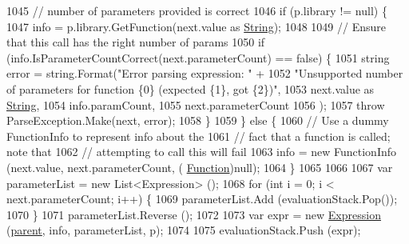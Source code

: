 \begin{DoxyCode}
1045                         \textcolor{comment}{// number of parameters provided is correct}
1046                         \textcolor{keywordflow}{if} (p.library != null) \{
1047                             info = p.library.GetFunction(next.value as \hyperlink{a00031_a301aa7c866593a5b625a8fc158bbeacea27118326006d3829667a400ad23d5d98}{String});
1048 
1049                             \textcolor{comment}{// Ensure that this call has the right number of params}
1050                             \textcolor{keywordflow}{if} (info.IsParameterCountCorrect(next.parameterCount) == \textcolor{keyword}{false}) \{
1051                                 \textcolor{keywordtype}{string} error = string.Format(\textcolor{stringliteral}{"Error parsing expression: "} +
1052                                     \textcolor{stringliteral}{"Unsupported number of parameters for function \{0\} (expected \{1\}, got
       \{2\})"},
1053                                     next.value as \hyperlink{a00031_a301aa7c866593a5b625a8fc158bbeacea27118326006d3829667a400ad23d5d98}{String},
1054                                     info.paramCount,
1055                                     next.parameterCount
1056                                 );
1057                                 \textcolor{keywordflow}{throw} ParseException.Make(next, error);
1058                             \}
1059                         \} \textcolor{keywordflow}{else} \{
1060                             \textcolor{comment}{// Use a dummy FunctionInfo to represent info about the}
1061                             \textcolor{comment}{// fact that a function is called; note that}
1062                             \textcolor{comment}{// attempting to call this will fail}
1063                             info = \textcolor{keyword}{new} FunctionInfo (next.value, next.parameterCount, (
      \hyperlink{a00031_ae0be2e5cf13d5779816102439e61ff1a}{Function})null);
1064                         \}
1065 
1066 
1067                         var parameterList = \textcolor{keyword}{new} List<Expression> ();
1068                         \textcolor{keywordflow}{for} (\textcolor{keywordtype}{int} i = 0; i < next.parameterCount; i++) \{
1069                             parameterList.Add (evaluationStack.Pop());
1070                         \}
1071                         parameterList.Reverse ();
1072 
1073                         var expr = \textcolor{keyword}{new} \hyperlink{a00082_a17e5101d02b96d0071e7a0223e4daa3d}{Expression} (\hyperlink{a00122_af313a82103fcc2ff5a177dbb06b92f7b}{parent}, info, parameterList, p);
1074 
1075                         evaluationStack.Push (expr);

\end{DoxyCode}
